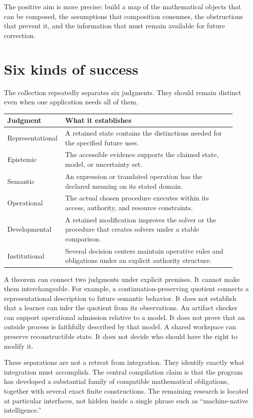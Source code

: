 \documentclass[11pt,oneside]{article}
\begin{document}
The positive aim is more precise: build a map of the mathematical objects that can be composed, the assumptions that composition consumes, the obstructions that prevent it, and the information that must remain available for future correction.

\section{Six kinds of success}
The collection repeatedly separates six judgments. They should remain distinct even when one application needs all of them.

\begin{longtable}{@{}p{0.20\linewidth}p{0.73\linewidth}@{}}
\toprule
Judgment & What it establishes\\\midrule
Representational & A retained state contains the distinctions needed for the specified future uses.\\
Epistemic & The accessible evidence supports the claimed state, model, or uncertainty set.\\
Semantic & An expression or translated operation has the declared meaning on its stated domain.\\
Operational & The actual chosen procedure executes within its access, authority, and resource constraints.\\
Developmental & A retained modification improves the solver or the procedure that creates solvers under a stable comparison.\\
Institutional & Several decision centers maintain operative rules and obligations under an explicit authority structure.\\\bottomrule
\end{longtable}

A theorem can connect two judgments under explicit premises. It cannot make them interchangeable. For example, a continuation-preserving quotient connects a representational description to future semantic behavior. It does not establish that a learner can infer the quotient from its observations. An artifact checker can support operational admission relative to a model. It does not prove that an outside process is faithfully described by that model. A shared workspace can preserve reconstructible state. It does not decide who should have the right to modify it.

These separations are not a retreat from integration. They identify exactly what integration must accomplish. The central compilation claim is that the program has developed a substantial family of compatible mathematical obligations, together with several exact finite constructions. The remaining research is located at particular interfaces, not hidden inside a single phrase such as ``machine-native intelligence.''
\end{document}
